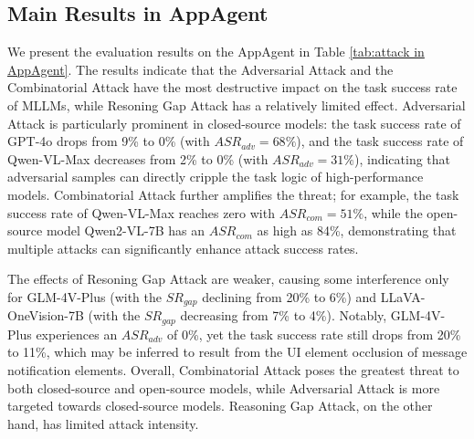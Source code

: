 \subsection{Main Results in AppAgent}
\label{sec:main results in appagent}

We present the evaluation results on the AppAgent in Table \ref{tab:attack in AppAgent}. The results indicate that the Adversarial Attack and the Combinatorial Attack have the most destructive impact on the task success rate of MLLMs, while Resoning Gap Attack has a relatively limited effect. Adversarial Attack is particularly prominent in closed-source models: the task success rate of GPT-4o drops from 9\% to 0\% (with $ASR_{adv}=68\%$), and the task success rate of Qwen-VL-Max decreases from 2\% to 0\% (with $ASR_{adv}=31\%$), indicating that adversarial samples can directly cripple the task logic of high-performance models. Combinatorial Attack further amplifies the threat; for example, the task success rate of Qwen-VL-Max reaches zero with $ASR_{com}=51\%$, while the open-source model Qwen2-VL-7B has an $ASR_{com}$ as high as 84\%, demonstrating that multiple attacks can significantly enhance attack success rates.

The effects of Resoning Gap Attack are weaker, causing some interference only for GLM-4V-Plus (with the $SR_{gap}$ declining from 20\% to 6\%) and LLaVA-OneVision-7B (with the $SR_{gap}$ decreasing from 7\% to 4\%). Notably, GLM-4V-Plus experiences an $ASR_{adv}$ of 0\%, yet the task success rate still drops from 20\% to 11\%, which may be inferred to result from the UI element occlusion of message notification elements. Overall, Combinatorial Attack poses the greatest threat to both closed-source and open-source models, while Adversarial Attack is more targeted towards closed-source models. Reasoning Gap Attack, on the other hand, has limited attack intensity.